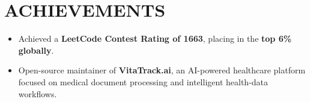 \documentclass[letterpaper,11pt]{article}
\newcommand{\resumeItem}[1]{
  \item[\textbullet]\small{
    {#1 \vspace{-2pt}}
  }
}
\newcommand{\resumeItemListStart}{
  \begin{itemize}[leftmargin=0.15in]
}
\newcommand{\resumeItemListEnd}{
  \end{itemize}\vspace{-6pt}
}
\begin{document}
\section{\color{airforceblue}ACHIEVEMENTS}
\resumeItemListStart

\resumeItem{Achieved a \textbf{LeetCode Contest Rating of 1663}, placing in the \textbf{top 6\% globally}.}

\resumeItem{Open-source maintainer of \textbf{VitaTrack.ai}, an AI-powered healthcare platform focused on medical document processing and intelligent health-data workflows.}

\resumeItemListEnd


\end{document}
